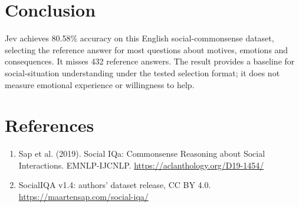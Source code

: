 \documentclass[10pt,a4paper]{article}
\begin{document}
\section{Conclusion}
Jev achieves 80.58\% accuracy on this English social-commonsense dataset, selecting the reference answer for most questions about motives, emotions and consequences. It misses 432 reference answers. The result provides a baseline for social-situation understanding under the tested selection format; it does not measure emotional experience or willingness to help.
\section*{References}
\begin{enumerate}
\item Sap et al. (2019). Social IQa: Commonsense Reasoning about Social Interactions. EMNLP-IJCNLP. \url{https://aclanthology.org/D19-1454/}
\item SocialIQA v1.4: authors’ dataset release, CC BY 4.0. \url{https://maartensap.com/social-iqa/}
\end{enumerate}
\end{document}
